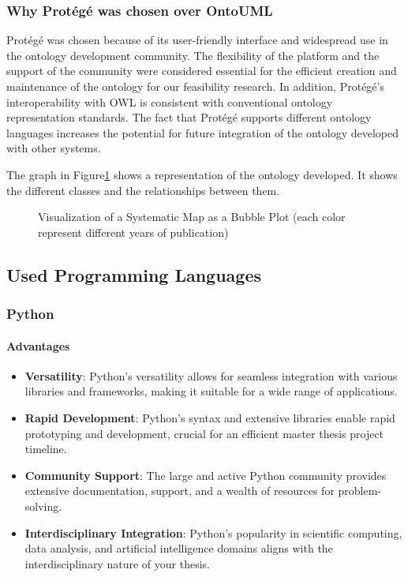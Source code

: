     \subsubsection{Why Protégé was chosen over OntoUML}
    Protégé was chosen because of its user-friendly interface and widespread use in the ontology development community. The flexibility of the platform and the support of the community were considered essential for the efficient creation and maintenance of the ontology for our feasibility research. In addition, Protégé's interoperability with OWL is consistent with conventional ontology representation standards. The fact that Protégé supports different ontology languages increases the potential for future integration of the ontology developed with other systems.
    
    The graph in Figure\ref{fig:viz-ontology} shows a representation of the ontology developed. It shows the different classes and the relationships between them.
    
    \begin{figure}[p]
        
         \caption{\label{fig:viz-ontology}  Visualization of a Systematic Map as a Bubble Plot (each color represent different years of publication)}
    \end{figure}

    
\subsection{Used Programming Languages}
    \subsubsection{Python}
        \paragraph{Advantages}
        \begin{itemize}
            \item \textbf{Versatility}: Python's versatility allows for seamless integration with various libraries and frameworks, making it suitable for a wide range of applications.
            \item \textbf{Rapid Development}: Python's syntax and extensive libraries enable rapid prototyping and development, crucial for an efficient master thesis project timeline.
            \item \textbf{Community Support}: The large and active Python community provides extensive documentation, support, and a wealth of resources for problem-solving.
            \item \textbf{Interdisciplinary Integration}: Python's popularity in scientific computing, data analysis, and artificial intelligence domains aligns with the interdisciplinary nature of your thesis.
        \end{itemize}
        
